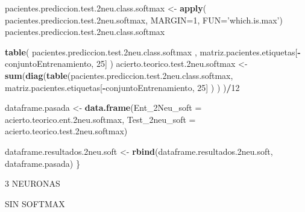 \documentclass[]{article}
\newenvironment{Shaded}{\begin{snugshade}}{\end{snugshade}}
\newcommand{\KeywordTok}[1]{\textcolor[rgb]{0.13,0.29,0.53}{\textbf{#1}}}
\newcommand{\DataTypeTok}[1]{\textcolor[rgb]{0.13,0.29,0.53}{#1}}
\newcommand{\DecValTok}[1]{\textcolor[rgb]{0.00,0.00,0.81}{#1}}
\newcommand{\StringTok}[1]{\textcolor[rgb]{0.31,0.60,0.02}{#1}}
\newcommand{\OperatorTok}[1]{\textcolor[rgb]{0.81,0.36,0.00}{\textbf{#1}}}
\newcommand{\NormalTok}[1]{#1}
\begin{document}
\begin{Shaded}
\begin{Highlighting}[]
\NormalTok{  pacientes.prediccion.test.2neu.class.softmax <-}\StringTok{ }\KeywordTok{apply}\NormalTok{( pacientes.prediccion.test.2neu.softmax, }\DataTypeTok{MARGIN=}\DecValTok{1}\NormalTok{, }\DataTypeTok{FUN=}\StringTok{'which.is.max'}\NormalTok{)}
\NormalTok{  pacientes.prediccion.test.2neu.class.softmax}
  
  \KeywordTok{table}\NormalTok{( pacientes.prediccion.test.2neu.class.softmax , matriz.pacientes.etiquetas[}\OperatorTok{-}\NormalTok{conjuntoEntrenamiento, }\DecValTok{25}\NormalTok{] )}
\NormalTok{  acierto.teorico.test.2neu.softmax <-}\StringTok{ }\KeywordTok{sum}\NormalTok{(}\KeywordTok{diag}\NormalTok{(}\KeywordTok{table}\NormalTok{(pacientes.prediccion.test.2neu.class.softmax, matriz.pacientes.etiquetas[}\OperatorTok{-}\NormalTok{conjuntoEntrenamiento, }\DecValTok{25}\NormalTok{] ) ) )}\OperatorTok{/}\DecValTok{12}
  
  
\NormalTok{  dataframe.pasada <-}\StringTok{ }\KeywordTok{data.frame}\NormalTok{(}\DataTypeTok{Ent_2Neu_soft =}\NormalTok{ acierto.teorico.ent.2neu.softmax,}
                                 \DataTypeTok{Test_2neu_soft =}\NormalTok{ acierto.teorico.test.2neu.softmax)}
  
\NormalTok{  dataframe.resultados.2neu.soft <-}\StringTok{ }\KeywordTok{rbind}\NormalTok{(dataframe.resultados.2neu.soft, dataframe.pasada)}
\NormalTok{\}}
\end{Highlighting}
\end{Shaded}

3 NEURONAS

SIN SOFTMAX
\end{document}
